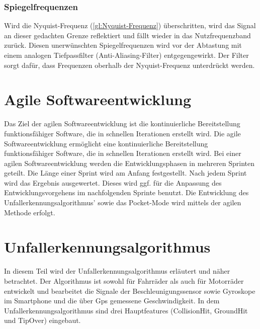 \subsubsection{Spiegelfrequenzen}
Wird die Nyquist-Frequenz (\autoref{gl:Nyquist-Frequenz}) überschritten, wird das Signal an dieser gedachten Grenze reflektiert und fällt wieder in das Nutzfrequenzband zurück. Diesen unerwünschten Spiegelfrequenzen wird vor der Abtastung mit einem analogen Tiefpassfilter (Anti-Aliasing-Filter) entgegengewirkt. Der Filter sorgt dafür, dass Frequenzen oberhalb der Nyquist-Frequenz unterdrückt werden. \citep{NTIAudioFFT}\citep{WeissteinFFT}






%
%
%
%
%
%
%



\section{Agile Softwareentwicklung}\label{abs:MethodenderSoftwareentwicklung}
Das Ziel der agilen Softwareentwicklung ist die kontinuierliche Bereitstellung funktionsfähiger Software, die in schnellen Iterationen erstellt wird. 
Die agile Softwareentwicklung ermöglicht eine kontinuierliche Bereitstellung funktionsfähiger Software, die in schnellen Iterationen erstellt wird. Bei einer agilen Softwareentwicklung werden die Entwicklungsphasen in mehreren Sprinten geteilt. Die Länge einer Sprint wird am Anfang festgestellt. Nach jedem Sprint wird das Ergebnis ausgewertet. Dieses wird ggf. für die Anpassung des Entwicklungsvorgehens im nachfolgenden Sprinte benutzt\citep{Brunskill2019}.
Die Entwicklung des Unfallerkennungsalgorithmus' sowie das Pocket-Mode wird mittels der agilen Methode erfolgt. 


%
%
%
%
%
%
%
\section{Unfallerkennungsalgorithmus} \label{abs:Unfallerkennungsalgorithmus}
%
%
%
%

In diesem Teil wird der Unfallerkennungsalgorithmus erläutert und näher betrachtet. Der Algorithmus ist sowohl für Fahrräder als auch für Motorräder entwickelt und bearbeitet die Signale der Beschleunigungssensor sowie Gyroskope im Smartphone und die über Gps gemessene Geschwindigkeit. In dem Unfallerkennungsalgorithmus sind drei Hauptfeatures (CollisionHit, GroundHit und TipOver) eingebaut.


